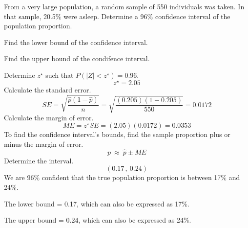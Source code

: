 
\begin{question}
From a very large population, a random sample of 550 individuals was
taken. In that sample, 20.5\% were asleep. Determine a 96\% confidence
interval of the population proportion.
\begin{answerlist}
  \item Find the lower bound of the confidence interval.
  \item Find the upper bound of the condifence interval.
\end{answerlist}
\end{question}

\begin{solution}
Determine \(z^\star\) such that \(P(|Z|<z^\star) = 0.96\).
\[z^\star = 2.05 \] Calculate the standard error.
\[SE = \sqrt{\frac{\hat{p}(1-\hat{p})}{n}} = \sqrt{\frac{(0.205)(1-0.205)}{550}} = 0.0172 \]
Calculate the margin of error.
\[ME = z^\star SE = (2.05)(0.0172) = 0.0353 \] To find the confidence
interval's bounds, find the sample proportion plus or minus the margin
of error. \[p ~\approx~ \hat{p} \pm ME \] Determine the interval.
\[(0.17\,,~ 0.24) \] We are 96\% confident that the true population
proportion is between 17\% and 24\%.
\begin{answerlist}
  \item The lower bound = 0.17, which can also be expressed as 17\%.
  \item The upper bound = 0.24, which can also be expressed as 24\%.
\end{answerlist}
\end{solution}

